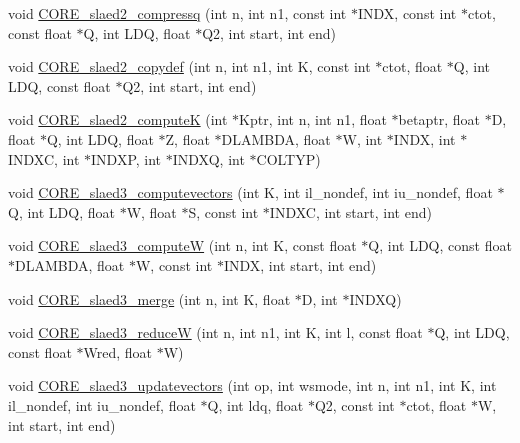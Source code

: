 \begin{DoxyCompactItemize}
\item 
void \hyperlink{group__CORE__float_ga8543c23b38071528776944d4f7ee8814_ga8543c23b38071528776944d4f7ee8814}{C\+O\+R\+E\+\_\+slaed2\+\_\+compressq} (int n, int n1, const int $\ast$I\+N\+D\+X, const int $\ast$ctot, const float $\ast$Q, int L\+D\+Q, float $\ast$Q2, int start, int end)
\item 
void \hyperlink{group__CORE__float_ga6dd13deaa9cdf22f2b6a61cc0a9db553_ga6dd13deaa9cdf22f2b6a61cc0a9db553}{C\+O\+R\+E\+\_\+slaed2\+\_\+copydef} (int n, int n1, int K, const int $\ast$ctot, float $\ast$Q, int L\+D\+Q, const float $\ast$Q2, int start, int end)
\item 
void \hyperlink{group__CORE__float_gab2040c7a5b171cbaf03a02524acc6a85_gab2040c7a5b171cbaf03a02524acc6a85}{C\+O\+R\+E\+\_\+slaed2\+\_\+compute\+K} (int $\ast$Kptr, int n, int n1, float $\ast$betaptr, float $\ast$D, float $\ast$Q, int L\+D\+Q, float $\ast$Z, float $\ast$D\+L\+A\+M\+B\+D\+A, float $\ast$W, int $\ast$I\+N\+D\+X, int $\ast$I\+N\+D\+X\+C, int $\ast$I\+N\+D\+X\+P, int $\ast$I\+N\+D\+X\+Q, int $\ast$C\+O\+L\+T\+Y\+P)
\item 
void \hyperlink{group__CORE__float_ga10b030eead90449f0273de172cd373e1_ga10b030eead90449f0273de172cd373e1}{C\+O\+R\+E\+\_\+slaed3\+\_\+computevectors} (int K, int il\+\_\+nondef, int iu\+\_\+nondef, float $\ast$Q, int L\+D\+Q, float $\ast$W, float $\ast$S, const int $\ast$I\+N\+D\+X\+C, int start, int end)
\item 
void \hyperlink{group__CORE__float_gaee14b14d5e19863f9925aced2c6c6ca2_gaee14b14d5e19863f9925aced2c6c6ca2}{C\+O\+R\+E\+\_\+slaed3\+\_\+compute\+W} (int n, int K, const float $\ast$Q, int L\+D\+Q, const float $\ast$D\+L\+A\+M\+B\+D\+A, float $\ast$W, const int $\ast$I\+N\+D\+X, int start, int end)
\item 
void \hyperlink{group__CORE__float_ga1ff0ab1630b128d74e944dca23992f86_ga1ff0ab1630b128d74e944dca23992f86}{C\+O\+R\+E\+\_\+slaed3\+\_\+merge} (int n, int K, float $\ast$D, int $\ast$I\+N\+D\+X\+Q)
\item 
void \hyperlink{group__CORE__float_ga842f01e6fa660b8eace4fa632d24aad2_ga842f01e6fa660b8eace4fa632d24aad2}{C\+O\+R\+E\+\_\+slaed3\+\_\+reduce\+W} (int n, int n1, int K, int l, const float $\ast$Q, int L\+D\+Q, const float $\ast$Wred, float $\ast$W)
\item 
void \hyperlink{group__CORE__float_gaf8f1862ff2260aa4ca6dc00ed998d15c_gaf8f1862ff2260aa4ca6dc00ed998d15c}{C\+O\+R\+E\+\_\+slaed3\+\_\+updatevectors} (int op, int wsmode, int n, int n1, int K, int il\+\_\+nondef, int iu\+\_\+nondef, float $\ast$Q, int ldq, float $\ast$Q2, const int $\ast$ctot, float $\ast$W, int start, int end)

\end{DoxyCompactItemize}
